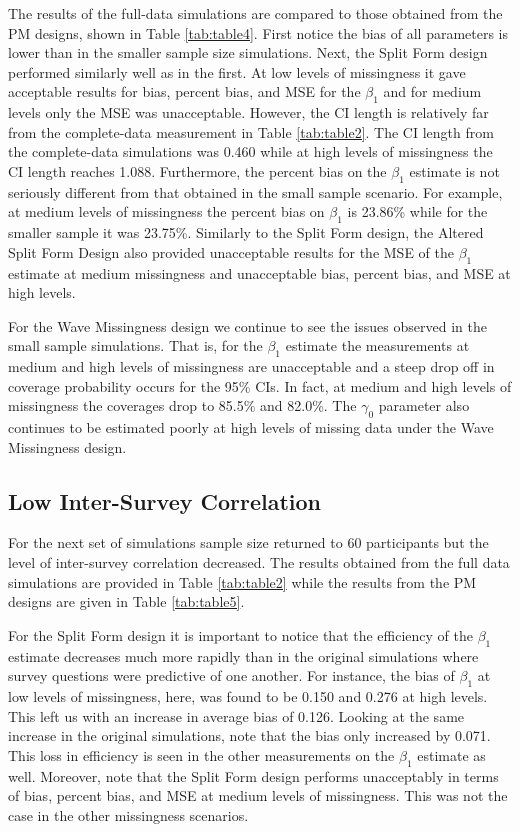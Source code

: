 \documentclass{svjour3}\usepackage[]{graphicx}\usepackage[]{color}
\begin{document}
The results of the full-data simulations are compared to those obtained from the PM designs, shown in Table \ref{tab:table4}. First notice the bias of all parameters is lower than in the smaller sample size simulations. Next, the Split Form design performed similarly well as in the first. At low levels of missingness it gave acceptable results for bias, percent bias, and MSE for the $\beta_1$ and for medium levels only the MSE was unacceptable. However, the CI length is relatively far from the complete-data measurement in Table \ref{tab:table2}. The CI length from the complete-data simulations was 0.460 while at high levels of missingness the CI length reaches 1.088. Furthermore, the percent bias on the $\beta_1$ estimate is not seriously different from that obtained in the small sample scenario. For example, at medium levels of missingness the percent bias on $\beta_1$ is 23.86\% while for the smaller sample it was 23.75\%.
Similarly to the Split Form design, the Altered Split Form Design also provided unacceptable results for the MSE of the $\beta_1$ estimate at medium missingness and unacceptable bias, percent bias, and MSE at high levels.  \par
For the Wave Missingness design we continue to see the issues observed in the small sample simulations. That is, for the $\beta_1$ estimate the measurements at medium and high levels of missingness are unacceptable and a steep drop off in coverage probability occurs for the 95\% CIs. In fact, at medium and high levels of missingness the coverages drop to 85.5\% and 82.0\%. The $\gamma_0$ parameter also continues to be estimated poorly at high levels of missing data under the Wave Missingness design. \par


\subsection{Low Inter-Survey Correlation}
\label{sec:3.3}
For the next set of simulations sample size returned to 60 participants but the level of inter-survey correlation decreased. The results obtained from the full data simulations are provided in Table \ref{tab:table2} while the results from the PM designs are given in Table \ref{tab:table5}. \par

For the Split Form design it is important to notice that the efficiency of the $\beta_1$ estimate decreases much more rapidly than in the original simulations where survey questions were predictive of one another. For instance, the bias of $\beta_1$ at low levels of missingness, here, was found to be 0.150 and 0.276 at high levels. This left us with an increase in average bias of 0.126. Looking at the same increase in the original simulations, note that the bias only increased by 0.071. This loss in efficiency is seen in the other measurements on the $\beta_1$ estimate as well. Moreover, note that the Split Form design performs unacceptably in terms of bias, percent bias, and MSE at medium levels of missingness. This was not the case in the other missingness scenarios. \par
\end{document}

